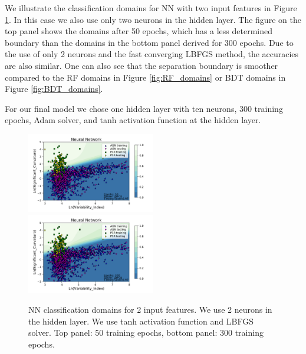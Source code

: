 We illustrate the classification domains for NN with two input features in Figure \ref{fig:NN_domains}. 
In this case we also use only two neurons in the hidden layer.
The figure on the top panel shows the domains after 50 epochs, which has a less determined boundary than the
domains in the bottom panel derived for 300 epochs. Due to the use of only 2 neurons and the fast converging LBFGS method, the accuracies are also similar.
One can also see that the separation boundary is smoother compared to the RF domains in Figure \ref{fig:RF_domains} or BDT domains in Figure \ref{fig:BDT_domains}.

For our final model we chose one hidden layer with ten neurons, 300 training epochs, Adam solver, and tanh activation function at the hidden layer.


\begin{figure}[h]
\center
\includegraphics[width=0.5\textwidth]{plots/classification_domains/nn_50_lbfgs.pdf}\\
\includegraphics[width=0.5\textwidth]{plots/classification_domains/nn_300_lbfgs.pdf}
\caption{NN classification domains for 2 input features. We use 2 neurons in the hidden layer. 
We use tanh activation function and LBFGS solver. Top panel: 50 training epochs, bottom panel: 300 training epochs.}
\label{fig:NN_domains}
\end{figure}

